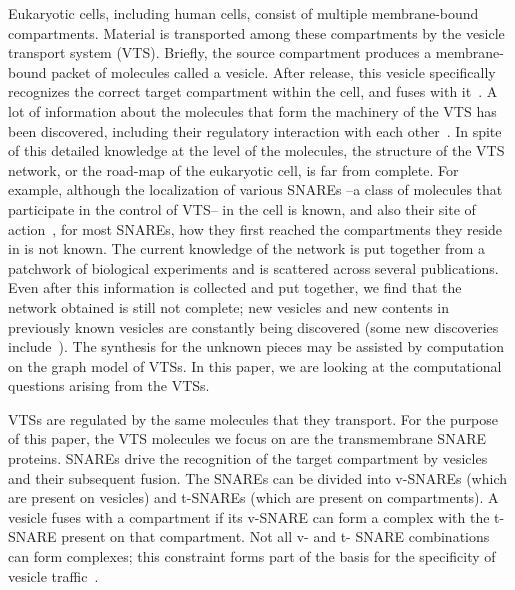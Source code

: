 
Eukaryotic cells, including human cells, consist of multiple membrane-bound compartments.
%
Material is transported among these compartments by the vesicle
transport system (VTS).
%
Briefly, the source compartment produces a membrane-bound packet of
molecules called a vesicle.
%
After release, this vesicle specifically recognizes the correct target
compartment within the cell, and fuses with it~\cite{alberts2013essential}.
%
A lot of information about the molecules that form the machinery of
the VTS has been discovered, including their regulatory interaction
with each other~\cite{bonifacino2004mechanisms}. 
%
In spite of this detailed knowledge at the level of the molecules, the
structure of the VTS network, or the road-map of the eukaryotic cell,
is far from complete.
%
For example, although the localization of various SNAREs --a class of
molecules that participate in the control of VTS-- in the cell is
known, and also their site of action~\cite{hong2014tethering}, for
most SNAREs, how they first reached the compartments they reside in is
not known.
%
The current knowledge of the network is put together from a patchwork
of biological experiments and is scattered across several publications.
%
Even after this information is collected and put together, we find
that the network obtained is still not complete; new vesicles and new
contents in previously known vesicles are constantly being discovered
(some new discoveries include~\cite{chanaday2017you, d2017tethering,
rodepeter2017indication, zhao2017conserved}).
%
The synthesis for the unknown pieces may be assisted by computation on
the graph model of VTSs.
%
% 
%
%
%
%
%
In this paper, we are looking at the computational questions 
arising from the VTSs.


%
VTSs are regulated by the same molecules that they transport.
%
For the purpose of this paper, the VTS molecules we focus on are the transmembrane SNARE proteins.
%
SNAREs drive the recognition of the target compartment by vesicles and
their subsequent fusion.
%
The SNAREs can be divided into v-SNAREs (which are present
on vesicles) and t-SNAREs (which are present on compartments). A
vesicle fuses with a compartment if its v-SNARE can form a complex
with the t-SNARE present on that compartment.
%
Not all v- and t- SNARE combinations can form complexes; this
constraint forms part of the basis for the specificity of vesicle
traffic~\cite{jahn2006snares}.
%

